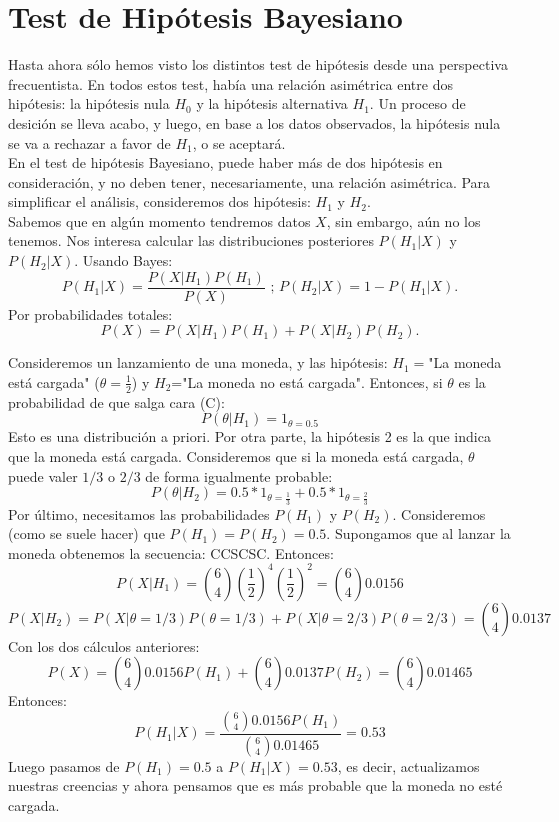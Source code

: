\section{Test de Hipótesis Bayesiano}
 Hasta ahora sólo hemos visto los distintos test de hipótesis desde una perspectiva frecuentista. En todos estos test, había una relación asimétrica entre dos hipótesis: la hipótesis nula $H_0$ y la hipótesis alternativa $H_1$. Un proceso de desición se lleva acabo, y luego, en base a los datos observados, la hipótesis nula se va a rechazar a favor de $H_1$, o se aceptará. \\
 En el test de hipótesis Bayesiano, puede haber más de dos hipótesis en consideración, y no deben tener, necesariamente, una relación asimétrica.
 Para simplificar el análisis, consideremos dos hipótesis: $H_1$ y $H_2$.\\
 Sabemos que en algún momento tendremos datos $X$, sin embargo, aún no los tenemos. Nos interesa calcular las distribuciones posteriores $P(H_1|X)$ y $P(H_2|X)$. Usando Bayes: 
 $$
 P(H_1|X)=\dfrac{P(X|H_1)P(H_1)}{P(X)} \text{ ; }
 P(H_2|X)=1-P(H_1|X).
 $$
Por probabilidades totales: 
$$
P(X)=P(X|H_1)P(H_1)+P(X|H_2)P(H_2).
$$
\begin{example}
    Consideremos un lanzamiento de una moneda, y las hipótesis: $H_1=$"La moneda está cargada" ($\theta=\frac{1}{2}$) y $H_2$="La moneda no está cargada". Entonces, si $\theta$ es la probabilidad de que salga cara (C):
    $$
    P(\theta|H_1)=1_{\theta=0.5}
    $$
    Esto es una distribución a priori. Por otra parte, la hipótesis 2 es la que indica que la moneda está cargada. Consideremos que si la moneda está cargada, $\theta$ puede valer $1/3$ o $2/3$ de forma igualmente probable: 
     $$
    P(\theta|H_2)= 0.5 *1_{\theta=\frac{1}{3}} + 0.5* 1_{\theta=\frac{2}{3}}
    $$
    Por último, necesitamos las probabilidades $P(H_1)$ y $P(H_2)$. Consideremos (como se suele hacer) que $P(H_1)=P(H_2)=0.5$. Supongamos que al lanzar la moneda obtenemos la secuencia: CCSCSC. Entonces: 
    $$
    P(X|H_1)=  \binom{6}{4} (\dfrac{1}{2})^{4}(\dfrac{1}{2})^{2} =  \binom{6}{4} 0.0156 
    $$
    $$
    P(X|H_2) = P(X|\theta=1/3)P(\theta=1/3)+  P(X|\theta=2/3)P(\theta=2/3) =\binom{6}{4} 0.0137 
    $$
    Con los dos cálculos anteriores: 
    $$
    P(X)= \binom{6}{4} 0.0156 P(H_1) + \binom{6}{4} 0.0137 P(H_2) = \binom{6}{4} 0.01465
    $$
    Entonces: 
    $$
    P(H_1|X)=\dfrac{ \binom{6}{4} 0.0156 P(H_1)}{\binom{6}{4} 0.01465}  = 0.53
    $$
    Luego pasamos de $P(H_1)=0.5$ a $P(H_1|X)=0.53$, es decir, actualizamos nuestras creencias y ahora pensamos que es más probable que la moneda no esté cargada.
\end{example}
 

